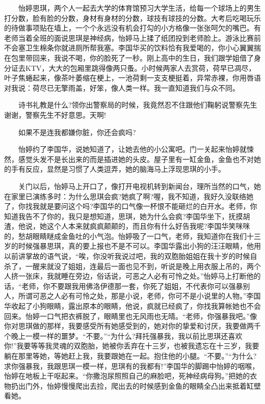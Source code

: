 \documentclass[12pt,UTF8]{ctexbook}
\begin{document}
　　怡婷思琪，两个人一起去大学的体育馆预习大学生活，给每一个球场上的男生打分数，脸有脸的分数，身材有身材的分数，球技有球技的分数。大考后吃喝玩乐的待做事项贴在墙上，一个个永远没有机会打勾的小方格像一张张呵欠的嘴巴。有老师当着全班的面说思琪是神经病，怡婷马上揉了纸团投到老师脸上。游泳比赛前不会塞卫生棉条你就进厕所帮我塞。李国华买的饮料恰有我爱喝的，你小心翼翼揣在包里带回来，我说不喝，你的脸死了一秒。刚上高中的生日，我们跟学姐借了身分证去KTV，大大的包厢里跳得像两只蚤。小时候两家人去赏荷，荷早已凋尽，叶子焦蜷起来，像茶叶萎缩在梗上，一池荷剩一支支梗挺着，异常赤裸，你用唇语对我说：荷尽已无擎雨盖，好笨，像人类一样。我一直知道我们与众不同。

　　诗书礼教是什么?领你出警察局的时候，我竟然忍不住跟他们鞠躬说警察先生谢谢，警察先生不好意思。天啊!

　　如果不是连我都嫌你脏，你还会疯吗?

　　怡婷约了李国华，说她知道了，让她去他的小公寓吧。门一关起来怡婷就悚然，感觉头发不是长出来的而是插进她的头皮。屋子里有一缸金鱼，金鱼也不对她的手有反应，显然是习惯了人类逗弄，她的脑海马上浮现思琪的小手。

　　关门以后，怡婷马上开口了，像打开电视机转到新闻台，理所当然的口气，她在家里已演练多时：为什么思琪会疯?她疯了啊?喔，我不知道，我好久没联络她了，你找我就是要问这个吗?李国华的口气像一杯恨不能砸烂的白开水。老师，你知道我告不了你的，我只是想知道，思琪，她为什么会疯?李国华坐下，抚摸胡渣，他说，她这个人本来就疯疯颠颠的，而且你有什么好告我呢?李国华笑咪咪的，愁胡眼睛瞇成金鱼吐的小气泡。怡婷吸了一口气，老师，我知道你在我们十三岁的时候强暴思琪，真的要上报也不是不可以。李国华露出小狗的汪汪眼睛，他用以前讲掌故的语气说，\enquote{唉，你没听我说过吧，我的双胞胎姐姐在我十岁的时候自杀了，一醒来就没了姐姐，连最后一面也见不到，听说是晚上用衣服上吊的，两个人挤一张床，我就睡在旁边，俗话说，可恶之人必有可怜之处。}怡婷马上打断他的话，\enquote{老师，你不要跟我用佛洛伊德那一套，你死了姐姐，不代表你可以强暴别人，所谓可恶之人必有可怜之处，那是小说，老师，你可不是小说里的人物。}李国华收起了小狗眼睛，露出原本的眼睛，他说，疯就已经疯了，你找我算帐她也不会回来。怡婷一口气把衣裤脱了，眼睛里也无风雨也无晴。\enquote{老师，你强暴我吧。}像你对思琪做的那样，我要感受所有她感受到的，她对你的挚爱和讨厌，我要做两千个晚上一模一样的噩梦。\enquote{不要。}\enquote{为什么?拜托强暴我，我以前比思琪还喜欢你!}我要等等我灵魂的双胞胎，她被你丢弃在十三岁，也被我遗忘在十三岁，我要躺在那里等她，等她赶上我，我要跟她在一起。抱住他的小腿。\enquote{不要。}\enquote{为什么?求你强暴我，我跟思琪一模一样，思琪有的我都有!}李国华的脚踢中怡婷的咽喉，怡婷在地板上干呕起来。\enquote{你撒泡尿照照自己的麻脸吧，死神经病母狗。}把她的衣物扔出门外，怡婷慢慢爬出去捡，爬出去的时候感到金鱼的眼睛全凸出来抵着缸壁看她。
\end{document}
